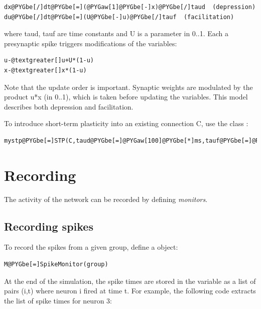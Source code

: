 \documentclass[letterpaper,10pt,english]{manual}
\begin{document}
\begin{Verbatim}[commandchars=@\[\]]
dx@PYGbe[/]dt@PYGbe[=](@PYGaw[1]@PYGbe[-]x)@PYGbe[/]taud  (depression)
du@PYGbe[/]dt@PYGbe[=](U@PYGbe[-]u)@PYGbe[/]tauf  (facilitation)
\end{Verbatim}

where taud, tauf are time constants and U is a parameter in 0..1.
Each a presynaptic spike triggers modifications of the variables:

\begin{Verbatim}[commandchars=@\[\]]
u-@textgreater[]u+U*(1-u)
x-@textgreater[]x*(1-u)
\end{Verbatim}

Note that the update order is important.
Synaptic weights are modulated by the product u*x (in 0..1), which is taken
before updating the variables. This model describes both depression and
facilitation.

To introduce short-term plasticity into an existing connection C, use the class
\hyperlink{brian.STP}{}:

\begin{Verbatim}[commandchars=@\[\]]
mystp@PYGbe[=]STP(C,taud@PYGbe[=]@PYGaw[100]@PYGbe[*]ms,tauf@PYGbe[=]@PYGaw[5]@PYGbe[*]ms,U@PYGbe[=]@PYGbe[.]@PYGaw[6])
\end{Verbatim}

\resetcurrentobjects


\section{Recording}

The activity of the network can be recorded by defining \emph{monitors}.


\subsection{Recording spikes}

To record the spikes from a given group, define a \hyperlink{brian.SpikeMonitor}{} object:

\begin{Verbatim}[commandchars=@\[\]]
M@PYGbe[=]SpikeMonitor(group)
\end{Verbatim}

At the end of the simulation, the spike times are stored in the variable  as
a list of pairs (i,t) where neuron i fired at time t. For example, the following code extracts
the list of spike times for neuron 3:
\end{document}
